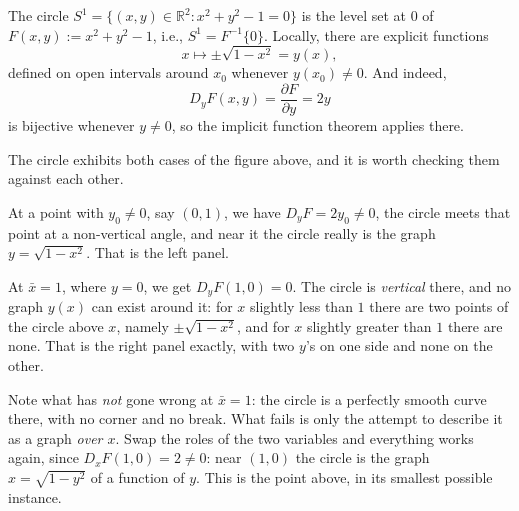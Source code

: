 \begin{example}
The circle $S^1 = \{(x,y) \in \mathbb{R}^2 : x^2+y^2-1=0\}$ is the level set at $0$ of
$F(x,y) := x^2+y^2-1$, i.e., $S^1 = F^{-1}\{0\}$. Locally, there are explicit functions
\[x \mapsto \pm\sqrt{1-x^2} = y(x),\]
defined on open intervals around $x_0$ whenever $y(x_0)\neq0$. And indeed,
\[D_yF(x,y) = \frac{\partial F}{\partial y} = 2y\]
is bijective whenever $y \neq 0$, so the implicit function theorem applies there.

\begin{remark}
The circle exhibits both cases of the figure above, and it is worth checking them against each
other.

At a point with $y_0 \neq 0$, say $(0,1)$, we have $D_yF = 2y_0 \neq 0$, the circle meets that
point at a non-vertical angle, and near it the circle really is the graph $y = \sqrt{1-x^2}$.
That is the left panel.

At $\bar x = 1$, where $y = 0$, we get $D_yF(1,0) = 0$. The circle is \emph{vertical} there, and
no graph $y(x)$ can exist around it: for $x$ slightly less than $1$ there are two points of the
circle above $x$, namely $\pm\sqrt{1-x^2}$, and for $x$ slightly greater than $1$ there are none.
That is the right panel exactly, with two $y$'s on one side and none on the other.

Note what has \emph{not} gone wrong at $\bar x = 1$: the circle is a perfectly smooth curve
there, with no corner and no break. What fails is only the attempt to describe it as a graph
\emph{over $x$}. Swap the roles of the two variables and everything works again, since
$D_xF(1,0) = 2 \neq 0$: near $(1,0)$ the circle is the graph $x = \sqrt{1-y^2}$ of a function
of $y$. This is the  point above, in its
smallest possible instance.
\end{remark}
\end{example}

